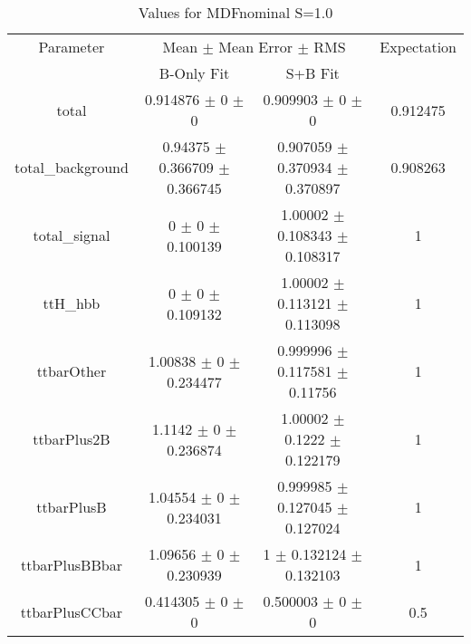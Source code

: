 \begin{table}
\centering
\caption{Values for MDFnominal S=1.0}
\begin{tabular}{cccc}
\toprule
Parameter & \multicolumn{2}{c}{Mean $\pm$ Mean Error $\pm$ RMS} & Expectation\\
 & B-Only Fit & S+B Fit & \\
\midrule
total & \num{0.914876} $\pm$ \num{0} $\pm$ \num{0} & \num{0.909903} $\pm$ \num{0} $\pm$ \num{0} & \num{0.912475}\\
total\_background & \num{0.94375} $\pm$ \num{0.366709} $\pm$ \num{0.366745} & \num{0.907059} $\pm$ \num{0.370934} $\pm$ \num{0.370897} & \num{0.908263}\\
total\_signal & \num{0} $\pm$ \num{0} $\pm$ \num{0.100139} & \num{1.00002} $\pm$ \num{0.108343} $\pm$ \num{0.108317} & \num{1}\\
ttH\_hbb & \num{0} $\pm$ \num{0} $\pm$ \num{0.109132} & \num{1.00002} $\pm$ \num{0.113121} $\pm$ \num{0.113098} & \num{1}\\
ttbarOther & \num{1.00838} $\pm$ \num{0} $\pm$ \num{0.234477} & \num{0.999996} $\pm$ \num{0.117581} $\pm$ \num{0.11756} & \num{1}\\
ttbarPlus2B & \num{1.1142} $\pm$ \num{0} $\pm$ \num{0.236874} & \num{1.00002} $\pm$ \num{0.1222} $\pm$ \num{0.122179} & \num{1}\\
ttbarPlusB & \num{1.04554} $\pm$ \num{0} $\pm$ \num{0.234031} & \num{0.999985} $\pm$ \num{0.127045} $\pm$ \num{0.127024} & \num{1}\\
ttbarPlusBBbar & \num{1.09656} $\pm$ \num{0} $\pm$ \num{0.230939} & \num{1} $\pm$ \num{0.132124} $\pm$ \num{0.132103} & \num{1}\\
ttbarPlusCCbar & \num{0.414305} $\pm$ \num{0} $\pm$ \num{0} & \num{0.500003} $\pm$ \num{0} $\pm$ \num{0} & \num{0.5}\\
\bottomrule
\end{tabular}
\end{table}